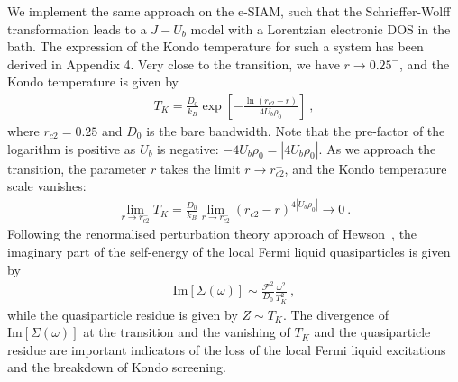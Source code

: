 We implement the same approach on the e-SIAM, such that the Schrieffer-Wolff transformation leads to a \(J-U_b\) model with a Lorentzian electronic DOS in the bath. The expression of the Kondo temperature for such a system has been derived in Appendix 4. Very close to the transition, we have \(r \to 0.25^{-}\), and the Kondo temperature is given by
\begin{eqnarray}
	T_K = \frac{D_0}{k_B} \exp\left[-\frac{\ln\left( r_{c2} - r \right)}{4 U_b \rho_0}\right]~,
\end{eqnarray}
where \(r_{c2} = 0.25\) and \(D_0\) is the bare bandwidth. Note that the pre-factor of the logarithm is positive as \(U_b\) is negative: \(-4U_b\rho_0 = |4U_b \rho_0|\). As we approach the transition, the parameter \(r\) takes the limit \(r \to r_{c2}^-\), and the Kondo temperature scale vanishes:
\begin{eqnarray}
	\lim_{r \to r_{c2}^-} T_K = \frac{D_0}{k_B} \lim_{r \to r_{c2}^-}\left(r_{c2} - r\right)^{4|U_b\rho_0|} \to 0~.
\end{eqnarray}
Following the renormalised perturbation theory approach of Hewson~\cite{hewson1993,coleman2015}, the imaginary part of the self-energy of the local Fermi liquid quasiparticles is given by
\begin{eqnarray}
	\text{Im}\left[\Sigma(\omega)\right] \sim \frac{\mathcal{F}^2}{D_{0}} \frac{\omega^2}{T_{K}^{2}}~, \label{sigma_rc2}
\end{eqnarray}
while the quasiparticle residue is given by \(Z \sim T_K\). The divergence of \(\text{Im}\left[\Sigma(\omega)\right]\) at the transition and the vanishing of \(T_K\) and the quasiparticle residue are important indicators of the loss of the local Fermi liquid excitations and the breakdown of Kondo screening.

